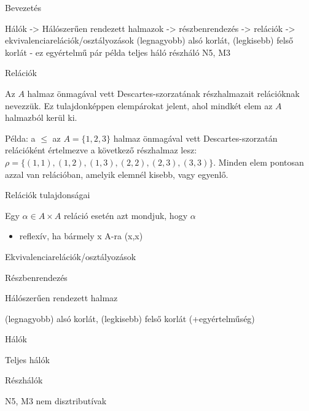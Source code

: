 Bevezetés

Hálók -> Hálószerűen rendezett halmazok -> részbenrendezés -> relációk -> ekvivalenciarelációk/osztályozások
(legnagyobb) alsó korlát, (legkisebb) felső korlát - ez egyértelmű
pár példa
teljes háló
részháló
N5, M3

Relációk

Az $A$ halmaz önmagával vett Descartes-szorzatának részhalmazait relációknak nevezzük. Ez tulajdonképpen elempárokat jelent,
ahol mindkét elem az $A$ halmazból kerül ki. 

Példa: a $\leq$ az $A = \{1,2,3\}$ halmaz önmagával vett Descartes-szorzatán relációként értelmezve a következő részhalmaz lesz: 
$\rho = \{(1,1), (1,2), (1,3), (2,2), (2,3), (3,3)\}$. Minden elem pontosan azzal van relációban, amelyik elemnél kisebb, vagy egyenlő.

Relációk tulajdonságai

Egy $\alpha \in A \times A$ reláció esetén azt mondjuk, hogy $\alpha$

\begin{itemize}

    \item reflexív, ha bármely x \in A-ra (x,x) \in \alpha
\end{itemize}

Ekvivalenciarelációk/osztályozások

Részbenrendezés

Hálószerűen rendezett halmaz

(legnagyobb) alsó korlát, (legkisebb) felső korlát (+egyértelműség)

Hálók

Teljes hálók

Részhálók

N5, M3 nem disztributívak
